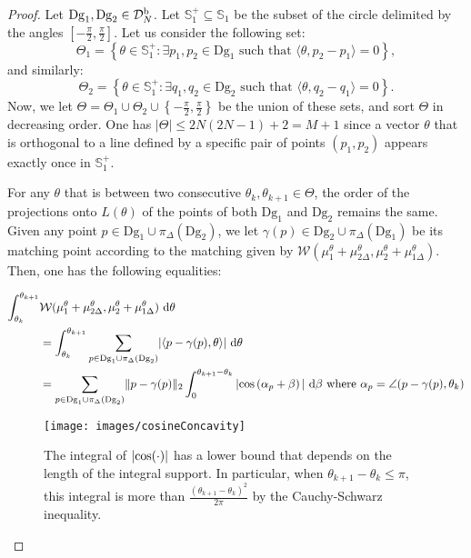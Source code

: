 \documentclass[11pt]{article}
\newcommand{\Dg}{\mathrm{Dg}}
\newcommand{\SpND}{{\mathcal D}_N^{\rm b}}
\begin{document}
\begin{proof}
Let $\Dg_1,\Dg_2\in \SpND$. Let $\mathbb{S}^+_1\subseteq\mathbb{S}_1$ be the subset of the circle delimited by the angles $\left[-\frac{\pi}{2},\frac{\pi}{2}\right]$.
Let us consider the following set:
$$\Theta_1 = \left\{\theta\in \mathbb{S}^+_1:\exists p_1,p_2\in \Dg_1\text{ such that }\langle\theta, p_2-p_1\rangle=0\right\},$$
and similarly:
$$\Theta_2 = \left\{\theta\in \mathbb{S}^+_1:\exists q_1,q_2\in \Dg_2\text{ such that }\langle\theta, q_2-q_1\rangle=0\right\}.$$
Now, we let $\Theta=\Theta_1\cup\Theta_2\cup\left\{-\frac{\pi}{2},\frac{\pi}{2}\right\}$ be the union of these sets, 
and sort $\Theta$ in decreasing order.
One has $|\Theta|\leq 2N(2N-1)+2=M+1$ since a vector $\theta$ that is orthogonal to a line defined by a specific pair of 
points $(p_1,p_2)$ appears exactly once in $\mathbb{S}_1^+$.

For any $\theta$ that is between two consecutive $\theta_k,\theta_{k+1}\in\Theta$, the order of the projections 
onto $L(\theta)$ of the points of both $\Dg_1$ and $\Dg_2$ remains the same. Given any point $p\in \Dg_1\cup\pi_\Delta(\Dg_2)$, 
we let $\gamma(p)\in \Dg_2\cup\pi_\Delta(\Dg_1)$ be its matching point according 
to the matching given by $\mathcal W(\mu_1^\theta+\mu_{2\Delta}^\theta,\mu_2^\theta+\mu_{1\Delta}^\theta)$.
Then, one has the following equalities:

\begin{align}
\int_{\theta_k}^{\theta_{k+1}}&\mathcal W(\mu_1^\theta+\mu_{2\Delta}^\theta,\mu_2^\theta+\mu_{1\Delta}^\theta)\ {\rm d}\theta\nonumber\\
&=\int_{\theta_k}^{\theta_{k+1}}\underset{p\in \Dg_1\cup\pi_\Delta(\Dg_2)}{\sum}|\langle p-\gamma(p),\theta\rangle|\ {\rm d}\theta\nonumber\\
&=\underset{p\in \Dg_1\cup\pi_\Delta(\Dg_2)}{\sum}\|p-\gamma(p)\|_2\int_0^{\theta_{k+1}-\theta_k}|{\rm cos}\left(\alpha_p+\beta\right)
|\ {\rm d}\beta{\rm\ where\ }\alpha_p=\angle(p-\gamma(p),\theta_k)\nonumber
\end{align}


\begin{figure}\begin{center} 
\texttt{[image: images/cosineConcavity]}
\caption{\label{fig:cosineConc}
The integral of $|{\rm cos}(\cdot)|$ has a lower bound that depends on the length of the integral support.
In particular, when $\theta_{k+1}-\theta_k\leq\pi$, this integral is more than $\frac{\left(\theta_{k+1}-\theta_k\right)^2}{2\pi}$ 
by the Cauchy-Schwarz inequality.}
\end{center}\end{figure}


\end{proof}
\end{document}
